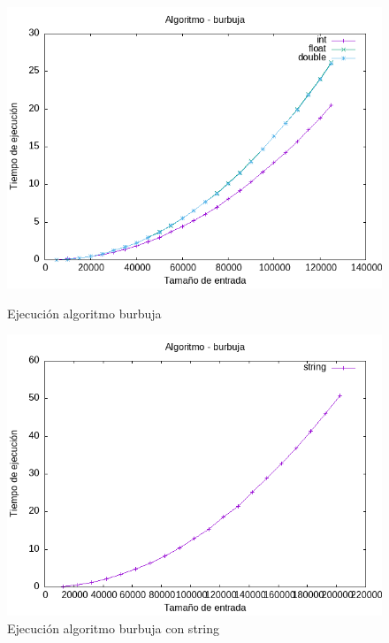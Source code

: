 \documentclass[11pt]{article}
\begin{document}
\begin{figure}[H]
    \begin{minipage}{0.5\textwidth}
        \centering
        \includegraphics[width=\linewidth]{assets/Img/burbuja.png}
        \caption{Ejecución algoritmo burbuja}
        \label{fig:burbuja}
    \end{minipage}%
    \begin{minipage}{0.5\textwidth}
        \centering
        \includegraphics[width=\linewidth]{assets/Img/burbujastring.png}
        \caption{Ejecución algoritmo burbuja con string}
        \label{fig:burbujastring}
    \end{minipage}
\end{figure}
\end{document}
